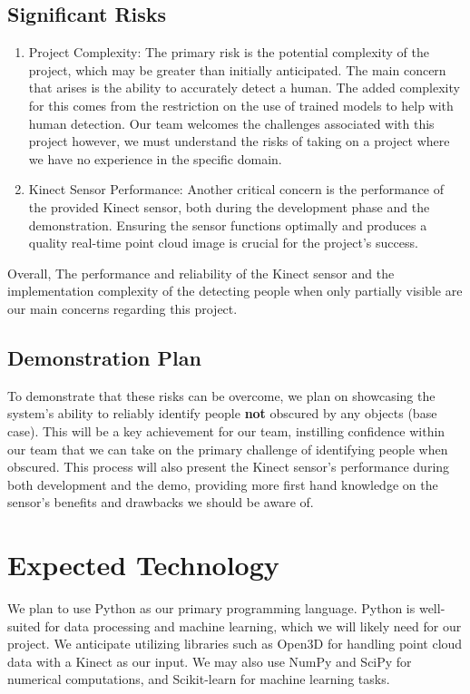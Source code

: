 \documentclass{article}
\begin{document}
\subsection*{Significant Risks}
\begin{enumerate}
\item Project Complexity: The primary risk is the potential complexity of the project, which may be greater than initially anticipated. The main concern that arises is the ability to accurately detect a human. 
The added complexity for this comes from the restriction on the use of trained models to help with human detection.
Our team welcomes the challenges associated with this project however, we must understand the risks of taking on a project where we have no experience in the specific domain.

\item Kinect Sensor Performance: Another critical concern is the performance of the provided Kinect sensor, both during the development phase and the demonstration. 
Ensuring the sensor functions optimally and produces a quality real-time point cloud image is crucial for the project's success.

\end{enumerate}

Overall, The performance and reliability of the Kinect sensor and the implementation complexity of the detecting people when only partially visible are our main concerns regarding this project.

\subsection*{Demonstration Plan}

To demonstrate that these risks can be overcome, we plan on showcasing the system's ability to reliably identify people \textbf{not} obscured by any objects (base case). 
This will be a key achievement for our team, instilling confidence within our team that we can take on the primary challenge of identifying people when obscured.
This process will also present the Kinect sensor's performance during both development and the demo, providing more first hand knowledge on the sensor's benefits and drawbacks we should be aware of.

\section{Expected Technology}

We plan to use Python as our primary programming language. 
Python is well-suited for data processing and machine learning, which we will likely need for our project.
We anticipate utilizing libraries such as Open3D for handling point cloud data with a Kinect as our input. 
We may also use NumPy and SciPy for numerical computations, and Scikit-learn for machine learning tasks.\\
\end{document}
